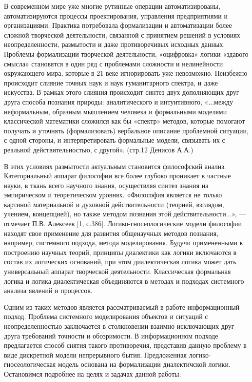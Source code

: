 \documentclass[a4paper,12pt]{report}
\begin{document}
В современном мире уже многие рутинные операции автоматизированы, автоматизируются процессы проектирования, управления предприятиями и организациями. Практика потребовала формализации и автоматизации более сложной творческой деятельности, связанной с принятием решений в условиях неопределенности, размытости и даже противоречивых исходных данных.  Проблемы формализации творческой деятельности, «оцифровка» логики «здавого смысла» становятся в один ряд с проблемами сложности и нелинейности окружающего мира, которые в 21 веке игнорировать уже невозможно. Неизбежно происходит слияние точных наук и наук гуманитарного спектра, и даже искусства. В рамках этого слияния происходит синтез двух дополняющих друг друга способа познания природы: аналитического и интуитивного, «...между неформальным, образным мышлением человека и формальными моделями классической математики сложился как бы «спектр» методов, которые помогают получать и уточнять (формализовать) вербальное описание проблемной ситуации, с одной стороны, и интерпретировать формальные модели, связывать их с реальной действительностью, с другой». (стр.12 Денисов А.А.) 

В этих условиях размытости актуальным становится философский анализ. Категориальный аппарат философии  все более глубоко проникает в частные науки, в ткань всего научного знания, осуществляя синтез знания на эмпирическом и теоретическом уровнях. «Философия является не только картиной материальной и духовной действительности (теорией, взглядом, учением, концепцией), но также методом познания этой действительности...», — отмечает П.В. Алексеев [1, с.386]. Логико-гносеологические модели философии находят свое применение для развития общенаучных методов познания, например, системного подхода, метода моделирования. Будучи примененными к построению научных теорий, принципы диалектики как логики включаются в состав их логических оснований, при этом диалектическая логика может дать универсальный аппарат творческой деятельности.
Классическая формальная логика и логика диалектическая объединяются в методах и подходах системного анализа явлений и процессов.

 Одним из таких методов является рассматриваемый в работе информационный подход. Проблема системного моделирования объектов и ситуаций с неопределенностью заключается в столкновении взаимно исключающих друг друга требований точности и обозримости. В информационном подходе предлагается способ снятия такого противоречия, представив данную проблему в виде дискретной модели непрерывного бытия. Предложенная логико-гносеологическая модель основана на формализации диалектичской логики. Остановимся подробнее на целях и задачах данной работы:
\end{document}
